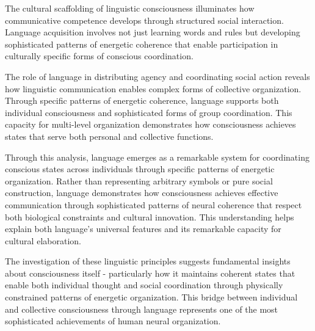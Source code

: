 The cultural scaffolding of linguistic consciousness \cite{Vygotsky2012} illuminates how communicative competence develops through structured social interaction. Language acquisition involves not just learning words and rules but developing sophisticated patterns of energetic coherence that enable participation in culturally specific forms of conscious coordination.

The role of language in distributing agency and coordinating social action \cite{Arbib2012} reveals how linguistic communication enables complex forms of collective organization. Through specific patterns of energetic coherence, language supports both individual consciousness and sophisticated forms of group coordination. This capacity for multi-level organization demonstrates how consciousness achieves states that serve both personal and collective functions.

Through this analysis, language emerges as a remarkable system for coordinating conscious states across individuals through specific patterns of energetic organization. Rather than representing arbitrary symbols or pure social construction, language demonstrates how consciousness achieves effective communication through sophisticated patterns of neural coherence that respect both biological constraints and cultural innovation. This understanding helps explain both language's universal features and its remarkable capacity for cultural elaboration.

The investigation of these linguistic principles suggests fundamental insights about consciousness itself - particularly how it maintains coherent states that enable both individual thought and social coordination through physically constrained patterns of energetic organization. This bridge between individual and collective consciousness through language represents one of the most sophisticated achievements of human neural organization.